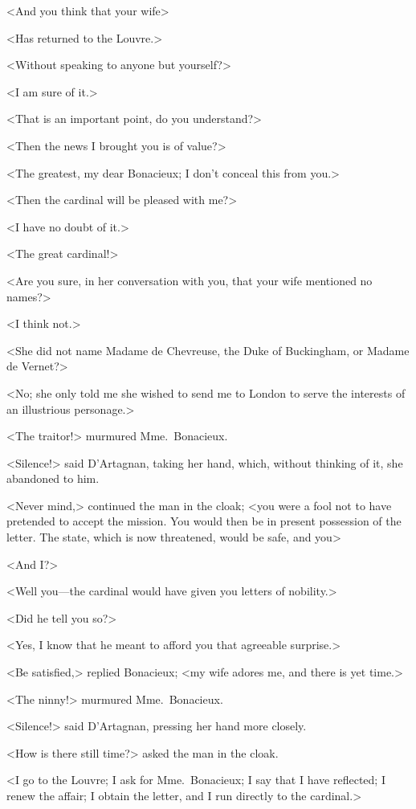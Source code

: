 <And you think that your wife\longdash> 

<Has returned to the Louvre.> 

<Without speaking to anyone but yourself?> 

<I am sure of it.> 

<That is an important point, do you understand?> 

<Then the news I brought you is of value?> 

<The greatest, my dear Bonacieux; I don't conceal this from you.> 

<Then the cardinal will be pleased with me?> 

<I have no doubt of it.> 

<The great cardinal!> 

<Are you sure, in her conversation with you, that your wife mentioned no names?> 

<I think not.> 

<She did not name Madame de Chevreuse, the Duke of Buckingham, or Madame de Vernet?> 

<No; she only told me she wished to send me to London to serve the interests of an illustrious personage.> 

<The traitor!> murmured Mme.~Bonacieux. 

<Silence!> said D'Artagnan, taking her hand, which, without thinking of it, she abandoned to him. 

<Never mind,> continued the man in the cloak; <you were a fool not to have pretended to accept the mission. You would then be in present possession of the letter. The state, which is now threatened, would be safe, and you\longdash> 

<And I?> 

<Well you—the cardinal would have given you letters of nobility.> 

<Did he tell you so?> 

<Yes, I know that he meant to afford you that agreeable surprise.> 

<Be satisfied,> replied Bonacieux; <my wife adores me, and there is yet time.> 

<The ninny!> murmured Mme.~Bonacieux. 

<Silence!> said D'Artagnan, pressing her hand more closely. 

<How is there still time?> asked the man in the cloak. 

<I go to the Louvre; I ask for Mme.~Bonacieux; I say that I have reflected; I renew the affair; I obtain the letter, and I run directly to the cardinal.> 

